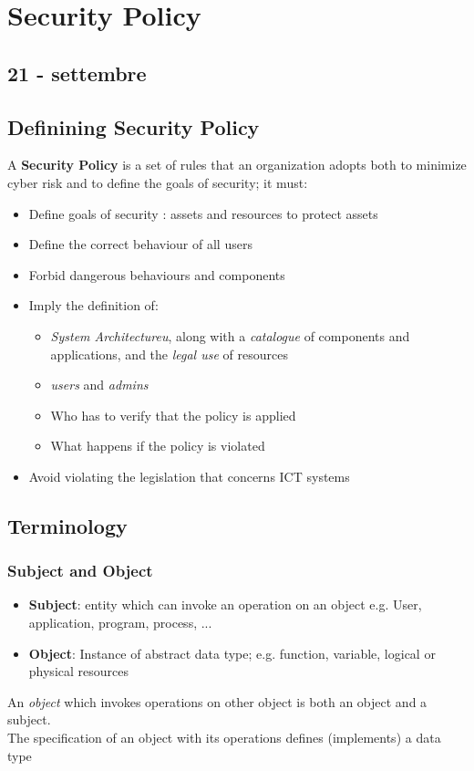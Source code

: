 \chapter{Security Policy}
\label{chapter:security_policy}
\section*{21 - settembre}

\section{Definining Security Policy}
A \textbf{Security Policy} is a set of rules that an organization adopts both to minimize cyber risk and to define the goals of security;
it must:
\begin{itemize}
    \item Define goals of security : assets and resources to protect assets
    \item Define the correct behaviour of all users
    \item Forbid dangerous behaviours and components
    \item Imply the definition of: 
    \begin{itemize}
        \item \textit{System Architectureu}, along with a \textit{catalogue} of components and applications, and the \textit{legal use} of resources
        \item \textit{users} and \textit{admins}
        \item Who has to verify that the policy is applied
        \item What happens if the policy is violated
    \end{itemize}
    \item Avoid violating the legislation that concerns ICT systems
\end{itemize}

\section{Terminology}
\subsection{Subject and Object}
\begin{itemize}
    \item \textbf{Subject}: entity which can invoke an operation on an object
    e.g. User, application, program, process, ... 
    \item \textbf{Object}:  Instance of abstract data type; e.g. function, variable, logical or physical resources
\end{itemize}
An \textit{object} which invokes operations on other object is both an object and a subject.\\
The specification of an object with its operations
defines (implements) a data type

